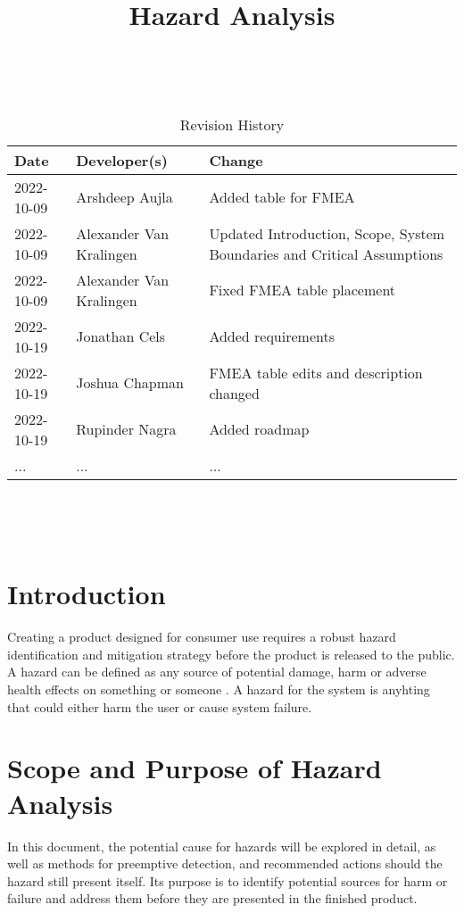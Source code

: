 \documentclass{article}
\title{Hazard Analysis\\\progname}
\author{\authname}
\date{}
\begin{document}
\maketitle
\thispagestyle{empty}

~\newpage


\begin{table}[hp]
\caption{Revision History} \label{TblRevisionHistory}
\begin{tabularx}{\textwidth}{llX}
\toprule
\textbf{Date} & \textbf{Developer(s)} & \textbf{Change}\\
\midrule
2022-10-09 & Arshdeep Aujla & Added table for FMEA\\
2022-10-09 & Alexander Van Kralingen & Updated Introduction, Scope, System Boundaries and Critical Assumptions\\
2022-10-09 & Alexander Van Kralingen & Fixed FMEA table placement\\
2022-10-19 & Jonathan Cels & Added requirements\\
2022-10-19 & Joshua Chapman & FMEA table edits and description changed\\
2022-10-19 & Rupinder Nagra & Added roadmap\\
... & ... & ...\\
\bottomrule
\end{tabularx}
\end{table}

~\newpage

\tableofcontents

~\newpage



\section{Introduction}{
    Creating a product designed for consumer use requires a robust hazard identification and mitigation strategy before the product is released to the public. A hazard can be defined as any source of potential damage, harm or adverse health effects on something or someone \cite{CCOHS}. A hazard for the \progname{} system is anyhting that could either harm the user or cause system failure.
}

\section{Scope and Purpose of Hazard Analysis}{
    In this document, the potential cause for hazards will be explored in detail, as well as methods for preemptive detection, and recommended actions should the hazard still present itself. Its purpose is to identify potential sources for harm or failure and address them before they are presented in the finished product.
}
\end{document}
